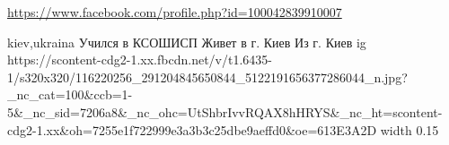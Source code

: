 
 
 
 
 

\url{https://www.facebook.com/profile.php?id=100042839910007}\par
kiev,ukraina
Учился в КСОШИСП
Живет в г. Киев
Из г. Киев
\ifcmt
  ig https://scontent-cdg2-1.xx.fbcdn.net/v/t1.6435-1/s320x320/116220256_291204845650844_5122191656377286044_n.jpg?_nc_cat=100&ccb=1-5&_nc_sid=7206a8&_nc_ohc=UtShbrIvvRQAX8hHRYS&_nc_ht=scontent-cdg2-1.xx&oh=7255e1f722999e3a3b3c25dbe9aeffd0&oe=613E3A2D
  width 0.15
\fi
